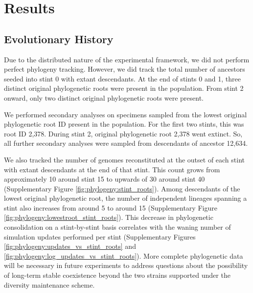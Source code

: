 \section{Results}

\subsection{Evolutionary History}

Due to the distributed nature of the experimental framework, we did not perform perfect phylogeny tracking.
However, we did track the total number of ancestors seeded into stint 0 with extant descendants.
At the end of stints 0 and 1, three distinct original phylogenetic roots were present in the population.
From stint 2 onward, only two distinct original phylogenetic roots were present.

We performed secondary analyses on specimens sampled from the lowest original phylogenetic root ID present in the population.
For the first two stints, this was root ID 2,378.
During stint 2, original phylogenetic root 2,378 went extinct.
So, all further secondary analyses were sampled from descendants of ancestor 12,634.

We also tracked the number of genomes reconstituted at the outset of each stint with extant descendants at the end of that stint.
This count grows from approximately 10 around stint 15 to upwards of 30 around stint 40 (Supplementary Figure \ref{fig:phylogeny:stint_roots}).
Among descendants of the lowest original phylogenetic root, the number of independent lineages spanning a stint also increases from around 5 to around 15
(Supplementary Figure \ref{fig:phylogeny:lowestroot_stint_roots}).
This decrease in phylogenetic consolidation on a stint-by-stint basis correlates with the waning number of simulation updates performed per stint (Supplementary Figures \ref{fig:phylogeny:updates_vs_stint_roots} and \ref{fig:phylogeny:log_updates_vs_stint_roots}).
More complete phylogenetic data will be necessary in future experiments to address questions about the possibility of long-term stable coexistence beyond the two strains supported under the diversity maintenance scheme.

